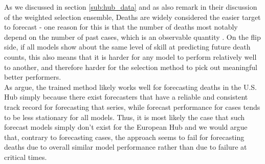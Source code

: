 As we discussed in section \ref{sub:hub_data} and as \cite{ray_comparing_2022} also remark in their discussion of the weighted selection ensemble, Deaths are widely considered the easier target to forecast - one reason for this is that the number of deaths most notably depend on the number of past cases, which is an observable quantity . On the flip side, if all models show about the same level of skill at predicting future death counts, this also means that it is harder for any model to perform relatively well to another, and therefore harder for the selection method to pick out meaningful better performers. \\
As \cite{ray_comparing_2022} argue, the trained method likely works well for forecasting deaths in the U.S. Hub simply because there exist forecasters that have a reliable and consistent track record for forecasting that series, while forecast performance for cases tends to be less stationary for all models. Thus, it is most likely the case that such forecast models simply don't exist for the European Hub and we would argue that, contrary to forecasting cases, the approach seems to fail for forecasting deaths due to overall similar model performance rather than due to failure at critical times. \medskip \\
